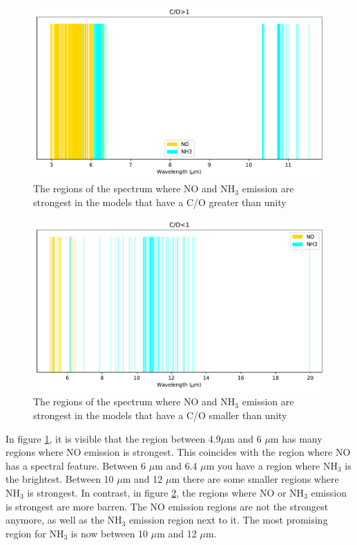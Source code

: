 \documentclass[twoside, single, authoryear, semicolon]{lion-msc}
\newcommand{\4}{$_4$}
\newcommand{\3}{$_3$}
\newcommand{\2}{$_2$}
\begin{document}
\begin{figure}[!ht]
    \centering
    \includegraphics[width=\linewidth]{Figures/ClassificationCOgt0.pdf}
    \caption{The regions of the spectrum where NO and NH\3 emission are strongest in the models that have a C/O greater than unity}
    \label{fig: class>1}
\end{figure}

\begin{figure}[!ht]
    \centering
    \includegraphics[width=\linewidth]{Figures/ClassificationCOst0.pdf}
    \caption{The regions of the spectrum where NO and NH\3 emission are strongest in the models that have a C/O smaller than unity}
    \label{fig: class<1}
\end{figure}

In figure \ref{fig: class>1}, it is visible that the region between 4.9$\mu$m and 6 $\mu$m has many regions where NO emission is strongest. This coincides with the region where NO has a spectral feature. Between 6 $\mu$m and 6.4 $\mu$m you have a region where NH\3 is the brightest. Between 10 $\mu$m and 12 $\mu$m there are some smaller regions where NH\3 is strongest. In contrast, in figure \ref{fig: class<1}, the regions where NO or NH\3 emission is strongest are more barren. The NO emission regions are not the strongest anymore, as well as the NH\3 emission region next to it. The most promising region for NH\3 is now between 10 $\mu$m and 12 $\mu$m. 
\end{document}
